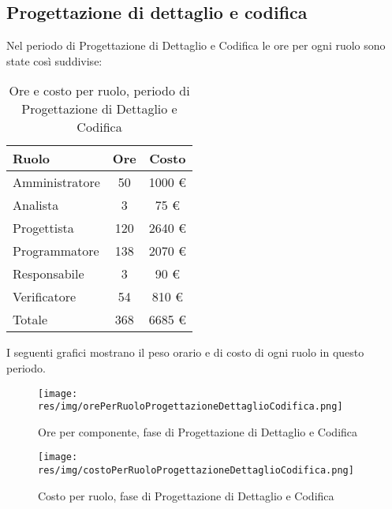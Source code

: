 \subsection{Progettazione di dettaglio e codifica}
Nel periodo di Progettazione di Dettaglio e Codifica le ore per ogni ruolo sono state così suddivise:

\begin{table}[H]
	\centering
	\begin{tabular}{ l c c }
		\textbf{Ruolo} & \textbf{Ore} & \textbf{Costo} \\
		\hline
		Amministratore & 50 & 1000 \euro \\
		Analista & 3 & 75 \euro \\
		Progettista & 120 & 2640 \euro \\
		Programmatore & 138 & 2070 \euro \\
		Responsabile & 3 & 90 \euro \\
		Verificatore & 54 & 810 \euro \\
		\hline
		Totale & 368 & 6685 \euro \\
		\hline
	\end{tabular}
	\caption{Ore e costo per ruolo, periodo di Progettazione di Dettaglio e Codifica}
\end{table}

I seguenti grafici mostrano il peso orario e di costo di ogni ruolo in questo periodo.

\begin{figure}[H]
  \begin{center}
    \texttt{[image: res/img/orePerRuoloProgettazioneDettaglioCodifica.png]}
  \caption{Ore per componente, fase di Progettazione di Dettaglio e Codifica}
  \end{center} 
\end{figure}  

\begin{figure}[H]
  \begin{center}
    \texttt{[image: res/img/costoPerRuoloProgettazioneDettaglioCodifica.png]}
  \caption{Costo per ruolo, fase di Progettazione di Dettaglio e Codifica}
  \end{center} 
\end{figure}  


